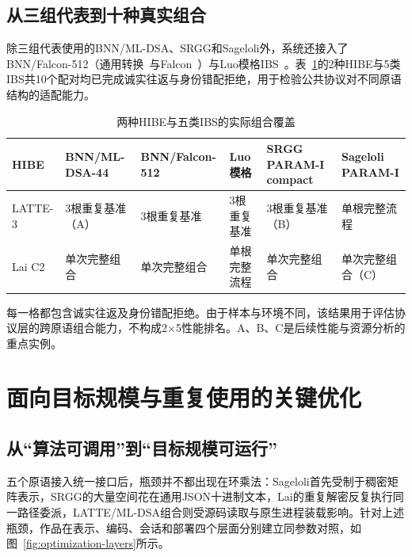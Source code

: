 \documentclass[UTF8,a4paper,12pt,oneside,openany,fontset=fandol]{ctexrep}
\begin{document}
\section{从三组代表到十种真实组合}
除三组代表使用的BNN/ML-DSA、SRGG和Sageloli外，系统还接入了BNN/Falcon-512（通用转换~\cite{galindo2006ibs}与Falcon~\cite{falcon2020}）与Luo模格IBS~\cite{luo2024ibs}。表~\ref{tab:two-by-five-coverage}的2种HIBE与5类IBS共10个配对均已完成诚实往返与身份错配拒绝，用于检验公共协议对不同原语结构的适配能力。

\begin{table}[htbp]
\centering
\scriptsize
\caption{两种HIBE与五类IBS的实际组合覆盖}
\label{tab:two-by-five-coverage}
\begin{tabularx}{\textwidth}{@{}>{\raggedright\arraybackslash}p{}>{\raggedright\arraybackslash}X>{\raggedright\arraybackslash}X>{\raggedright\arraybackslash}X>{\raggedright\arraybackslash}X>{\raggedright\arraybackslash}X@{}}
\toprule
\rowcolor{black!8} HIBE & BNN/ML-DSA-44 & BNN/Falcon-512 & Luo模格 & SRGG PARAM-I compact & Sageloli PARAM-I \\
\midrule
LATTE-3 & 3根重复基准（A） & 3根重复基准 & 3根重复基准 & 3根重复基准（B） & 单根完整流程 \\
Lai C2 & 单次完整组合 & 单次完整组合 & 单根完整流程 & 单次完整组合 & 单次完整组合（C） \\
\bottomrule
\end{tabularx}
\end{table}

每一格都包含诚实往返及身份错配拒绝。由于样本与环境不同，该结果用于评估协议层的跨原语组合能力，不构成2\(\times\)5性能排名。A、B、C是后续性能与资源分析的重点实例。

\chapter{面向目标规模与重复使用的关键优化}

\section{从“算法可调用”到“目标规模可运行”}
五个原语接入统一接口后，瓶颈并不都出现在环乘法：Sageloli首先受制于稠密矩阵表示，SRGG的大量空间花在通用JSON十进制文本，Lai的重复解密反复执行同一路径委派，LATTE/ML-DSA组合则受源码读取与原生进程装载影响。针对上述瓶颈，作品在表示、编码、会话和部署四个层面分别建立同参数对照，如图~\ref{fig:optimization-layers}所示。
\end{document}
